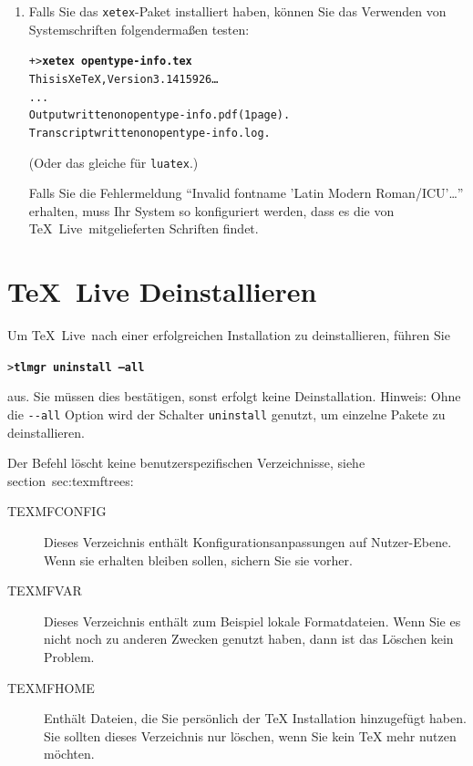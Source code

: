 \documentclass[12pt,ngerman,a4paper,fullparskip]{report}
\newcommand{\TL}{\TeX\ Live\xspace}
\newcommand{\code}[1]{\texttt{#1}}
\newcommand{\filename}[1]{\texttt{#1}}
\newcommand{\Ucom}[1]{\textbf{\texttt{#1}}}
\begin{document}
\begin{enumerate}
\item Falls Sie das \filename{xetex}-Paket installiert haben, können Sie
das Verwenden von Systemschriften folgendermaßen testen:
\begin{alltt}
+> \Ucom{xetex opentype-info.tex}
This is XeTeX, Version 3.1415926\dots
...
Output written on opentype-info.pdf (1 page).
Transcript written on opentype-info.log.
\end{alltt}

(Oder das gleiche für \filename{luatex}.)

Falls Sie die Fehlermeldung \enquote{Invalid fontname 'Latin Modern
Roman/ICU'\dots} erhalten, muss Ihr System so konfiguriert werden, dass
es die von \TL\ mitgelieferten Schriften findet. %
\end{enumerate}

\section{\TL Deinstallieren}
\label{sec:uninstall}

Um \TL\ nach einer erfolgreichen Installation zu deinstallieren, führen Sie

\begin{alltt}
> \Ucom{tlmgr uninstall --all}
\end{alltt}

aus. Sie müssen dies bestätigen, sonst erfolgt keine Deinstallation. Hinweis:
Ohne die \code{-{}-all} Option wird der Schalter \code{uninstall} genutzt, um einzelne Pakete zu deinstallieren.

Der Befehl löscht keine benutzerspezifischen Verzeichnisse, siehe section~{sec:texmftrees}:

\begin{description}
\item [TEXMFCONFIG] Dieses Verzeichnis enthält Konfigurationsanpassungen auf Nutzer-Ebene. Wenn sie erhalten bleiben sollen, sichern Sie sie vorher.

\item [TEXMFVAR] Dieses Verzeichnis enthält zum Beispiel lokale Formatdateien. Wenn Sie es nicht noch zu anderen Zwecken genutzt haben, dann ist das Löschen kein Problem.

\item[TEXMFHOME] Enthält Dateien, die Sie persönlich der TeX Installation hinzugefügt haben. Sie sollten dieses Verzeichnis nur löschen, wenn Sie kein TeX mehr nutzen möchten.

\end{description}
\end{document}
